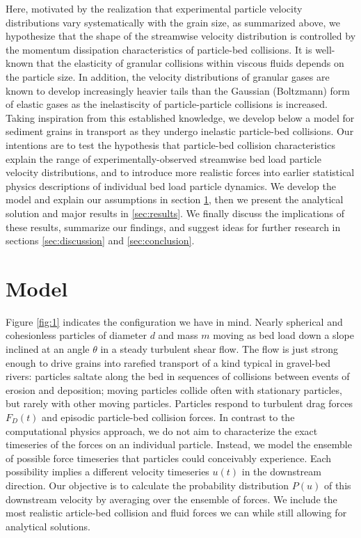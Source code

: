 Here, motivated by the realization that experimental particle velocity distributions vary systematically with the grain size, as summarized above, we hypothesize that the shape of the streamwise velocity distribution is controlled by the momentum dissipation characteristics of particle-bed collisions.
It is well-known that the elasticity of granular collisions within viscous fluids depends on the particle size.
In addition, the velocity distributions of granular gases are known to develop increasingly heavier tails than the Gaussian (Boltzmann) form of elastic gases as the inelastiscity of particle-particle collisions is increased.
Taking inspiration from this established knowledge, we develop below a model for sediment grains in transport as they undergo inelastic particle-bed collisions. Our intentions are to test the hypothesis that particle-bed collision characteristics explain the range of experimentally-observed streamwise bed load particle velocity distributions, and to introduce more realistic forces into earlier statistical physics descriptions of individual bed load particle dynamics. 
We develop the model and explain our assumptions in section \ref{sec:model}, then we present the analytical solution and major results in \ref{sec:results}. We finally discuss the implications of these results, summarize our findings, and suggest ideas for further research in sections \ref{sec:discussion} and \ref{sec:conclusion}.


\section{Model}
\label{sec:model}

Figure \ref{fig:1} indicates the configuration we have in mind. Nearly spherical and cohesionless particles of diameter $d$ and mass $m$ moving as bed load down a slope inclined at an angle $\theta$ in a steady turbulent shear flow. The flow is just strong enough to drive grains into rarefied transport of a kind typical in gravel-bed rivers: particles saltate along the bed in sequences of collisions between events of erosion and deposition; moving particles collide often with stationary particles, but rarely with other moving particles.
Particles respond to turbulent drag forces $F_D(t)$ and episodic particle-bed collision forces. In contrast to the computational physics approach, we do not aim to characterize the exact timeseries of the forces on an individual particle. Instead, we model the ensemble of possible force timeseries that particles could conceivably experience. Each possibility implies a different velocity timeseries $u(t)$ in the downstream direction.
Our objective is to calculate the probability distribution $P(u)$ of this downstream velocity by averaging over the ensemble of forces.
We include the most realistic article-bed collision and fluid forces we can while still allowing for analytical solutions. 

